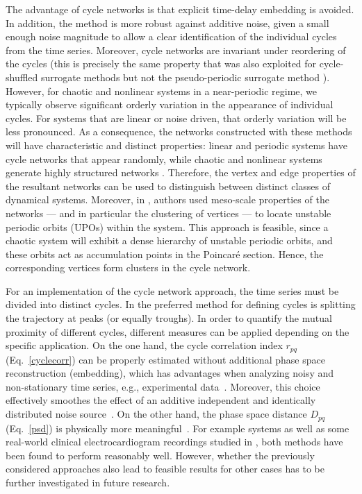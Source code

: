 		The advantage of cycle networks is that explicit time-delay embedding is avoided. In addition, the method is more robust against additive noise, given a small enough noise magnitude to allow a clear identification of the individual cycles from the time series. Moreover, cycle networks are invariant under reordering of the cycles (this is precisely the same property that was also exploited for cycle-shuffled surrogate methods \cite{Theiler1996} but not the pseudo-periodic surrogate method \cite{Small2001}). However, for chaotic and nonlinear systems in a near-periodic regime, we typically observe significant orderly variation in the appearance of individual cycles. For systems that are linear or noise driven, that orderly variation will be less pronounced. As a consequence, the networks constructed with these methods will have characteristic and distinct properties: linear and periodic systems have cycle networks that appear randomly, while chaotic and nonlinear systems generate highly structured networks \cite{Zhang2006,Zhang2008e}. Therefore, the vertex and edge properties of the resultant networks can be used to distinguish between distinct classes of dynamical systems. Moreover, in \cite{Zhang2006b}, authors used meso-scale properties of the networks --- and in particular the clustering of vertices --- to locate unstable periodic orbits (UPOs) within the system. This approach is feasible, since a chaotic system will exhibit a dense hierarchy of unstable periodic orbits, and these orbits act as accumulation points in the Poincar\'e section. Hence, the corresponding vertices form clusters in the cycle network.

		For an implementation of the cycle network approach, the time series must be divided into distinct cycles. In \cite{Zhang2006,Zhang2008} the preferred method for defining cycles is splitting the trajectory at peaks (or equally troughs). In order to quantify the mutual proximity of different cycles, different measures can be applied depending on the specific application. On the one hand, the cycle correlation index $r_{pq}$ (Eq.~\ref{cyclecorr}) can be properly estimated without additional phase space reconstruction (embedding), which has advantages when analyzing noisy and non-stationary time series, e.g., experimental data~\cite{Zhang2006}. Moreover, this choice effectively smoothes the effect of an additive independent and identically distributed noise source~\cite{Zhang2006b}. On the other hand, the phase space distance $D_{pq}$ (Eq.~\ref{psd}) is physically more meaningful~\cite{Zhang2008}. For example systems as well as some real-world clinical electrocardiogram recordings studied in \cite{Zhang2006,Zhang2008}, both methods have been found to perform reasonably well. However, whether the previously considered approaches also lead to feasible results for other cases has to be further investigated in future research.

